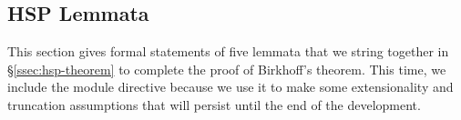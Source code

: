 \documentclass[a4paper,UKenglish,cleveref,autoref,thm-restate]{lipics-v2021}
\begin{document}
















\subsection{HSP Lemmata}\label{ssec:hsp-lemmata}
This section gives formal statements of five lemmata that we string together in \S\ref{ssec:hsp-theorem} to complete the proof of Birkhoff's theorem.
This time, we include the module directive because we use it to make some extensionality and truncation assumptions that will persist until the end of the development.
\ccpad
\end{document}
